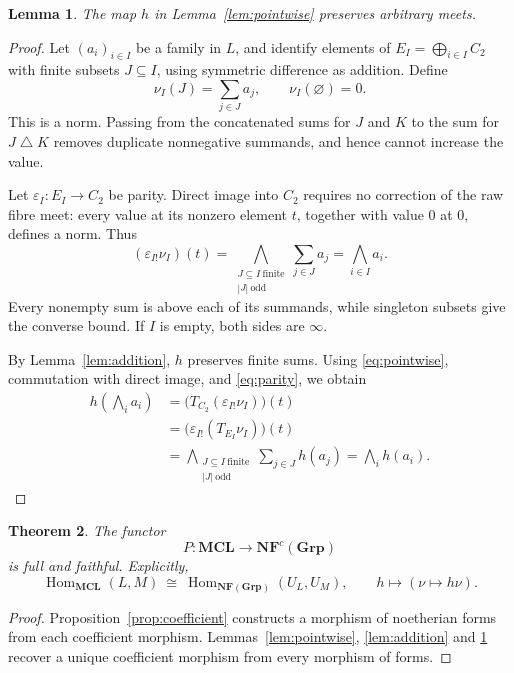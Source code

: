 \documentclass[12pt,a4paper]{amsart}
\newtheorem{theorem}{Theorem}[section]
\newtheorem{lemma}[theorem]{Lemma}
\theoremstyle{definition}
\newcommand{\Grp}{\mathbf{Grp}}
\newcommand{\NF}{\mathbf{NF}}
\newcommand{\MCL}{\mathbf{MCL}}
\newcommand{\eps}{\varepsilon}
\DeclareMathOperator{\Hom}{Hom}
\begin{document}
\begin{lemma}\label{lem:arbitrarymeets}
The map $h$ in Lemma~\ref{lem:pointwise} preserves arbitrary meets.
\end{lemma}
\begin{proof}
Let $(a_i)_{i\in I}$ be a family in $L$, and identify elements of
$E_I=\bigoplus_{i\in I}C_2$ with finite subsets $J\subseteq I$, using symmetric difference as addition. Define
\[
                      \nu_I(J)=\sum_{j\in J}a_j,\qquad
                      \nu_I(\varnothing)=0.
\]
This is a norm. Passing from the concatenated sums for $J$ and $K$ to the sum for $J\mathbin{\triangle}K$ removes duplicate nonnegative summands, and hence cannot increase the value.

Let $\eps_I:E_I\to C_2$ be parity. Direct image into $C_2$ requires no correction of the raw fibre meet: every value at its nonzero element $t$, together with value $0$ at $0$, defines a norm. Thus
\begin{equation}\label{eq:parity}
  (\eps_{I!}\nu_I)(t)
  =\bigwedge_{\substack{J\subseteq I\ \mathrm{finite}\\|J|\ \mathrm{odd}}}
          \sum_{j\in J}a_j
  =\bigwedge_{i\in I}a_i.
\end{equation}
Every nonempty sum is above each of its summands, while singleton subsets give the converse bound. If $I$ is empty, both sides are $\infty$.

By Lemma~\ref{lem:addition}, $h$ preserves finite sums. Using \eqref{eq:pointwise}, commutation with direct image, and \eqref{eq:parity}, we obtain
\[
 \begin{aligned}
 h\left(\bigwedge_i a_i\right)
 &=\bigl(T_{C_2}(\eps_{I!}\nu_I)\bigr)(t)\\
 &=\bigl(\eps_{I!}(T_{E_I}\nu_I)\bigr)(t)\\
 &=\bigwedge_{\substack{J\subseteq I\ \mathrm{finite}\\|J|\ \mathrm{odd}}}
                  \sum_{j\in J}h(a_j)
  =\bigwedge_i h(a_i).
 \end{aligned}
\]
\end{proof}

\begin{theorem}\label{thm:full}
The functor
\[
                              P:\MCL\longrightarrow\NF^c(\Grp)
\]
is full and faithful. Explicitly,
\[
 \Hom_{\MCL}(L,M)
 \ \cong\
 \Hom_{\NF(\Grp)}(U_L,U_M),\qquad
 h\longmapsto(\nu\mapsto h\nu).
\]
\end{theorem}
\begin{proof}
Proposition~\ref{prop:coefficient} constructs a morphism of noetherian forms from each coefficient morphism. Lemmas~\ref{lem:pointwise}, \ref{lem:addition} and \ref{lem:arbitrarymeets} recover a unique coefficient morphism from every morphism of forms.
\end{proof}
\end{document}
